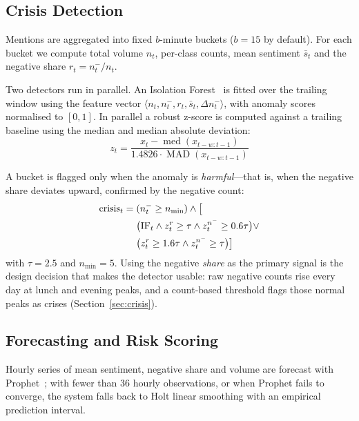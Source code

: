 \documentclass[conference]{IEEEtran}
\begin{document}
\subsection{Crisis Detection}

Mentions are aggregated into fixed $b$-minute buckets ($b=15$ by default). For each bucket
we compute total volume $n_t$, per-class counts, mean sentiment $\bar{s}_t$ and the
negative share $r_t = n^-_t / n_t$.

Two detectors run in parallel. An Isolation Forest~\cite{liu2008isolation} is fitted over
the trailing window using the feature vector
$\langle n_t, n^-_t, r_t, \bar{s}_t, \Delta n^-_t \rangle$, with anomaly scores normalised
to $[0,1]$. In parallel a robust z-score is computed against a trailing baseline using the
median and median absolute deviation:
\begin{equation}
z_t = \frac{x_t - \operatorname{med}(x_{t-w:t-1})}
{1.4826 \cdot \operatorname{MAD}(x_{t-w:t-1})}
\end{equation}

A bucket is flagged only when the anomaly is \emph{harmful}---that is, when the negative
share deviates upward, confirmed by the negative count:
\begin{align}
\mathrm{crisis}_t = {} & (n^-_t \ge n_{\min}) \wedge \big[ \notag \\
& \big(\mathrm{IF}_t \wedge z^r_t \ge \tau \wedge z^{n^-}_t \ge 0.6\tau\big) \vee \notag \\
& \big(z^r_t \ge 1.6\tau \wedge z^{n^-}_t \ge \tau\big) \big]
\end{align}
with $\tau = 2.5$ and $n_{\min} = 5$. Using the negative \emph{share} as the primary
signal is the design decision that makes the detector usable: raw negative counts rise
every day at lunch and evening peaks, and a count-based threshold flags those normal peaks
as crises (Section~\ref{sec:crisis}).

\subsection{Forecasting and Risk Scoring}

Hourly series of mean sentiment, negative share and volume are forecast with
Prophet~\cite{taylor2018forecasting}; with fewer than 36 hourly observations, or when
Prophet fails to converge, the system falls back to Holt linear smoothing with an
empirical prediction interval.
\end{document}
